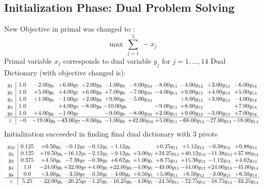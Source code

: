 \documentclass[9pt]{article}
\begin{document}
\subsection{Initialization Phase: Dual Problem Solving}
New Objective in primal was changed to : \[ \max\ \sum_{j=1}^{5}\ - x_j \] 
Primal variable $x_j$ corresponds to dual variable $y_j$ for $j = 1,\ldots,14$
Dual Dictionary (with objective changed is): 
\[\begin{array}{c| c c@{\hskip 2pt} c@{\hskip 2pt} c@{\hskip 2pt} c@{\hskip 2pt} c@{\hskip 2pt} c@{\hskip 2pt} c@{\hskip 2pt} c@{\hskip 2pt} c@{\hskip 2pt} }
 y_{1}   &  1.0 & -2.00 y_{6} & +  6.00 y_{7} & +  2.00 y_{8} & -1.00 y_{9} & -8.00 y_{10} & -8.00 y_{11} & -4.00 y_{12} & +  3.00 y_{13} & -6.00 y_{14}\\
 y_{2}   &  1.0 & +  5.00 y_{6} & +  4.00 y_{7} & +  6.00 y_{8} & +  7.00 y_{9} & -7.00 y_{10} & -4.00 y_{11} & +  9.00 y_{12} & +  4.00 y_{13} & +  5.00 y_{14}\\
 y_{3}   &  1.0 & +  1.00 y_{6} & -1.00 y_{7} & +  2.00 y_{8} & +  9.00 y_{9} & -5.00 y_{10} &   & +  8.00 y_{12} & +  3.00 y_{13} & -4.00 y_{14}\\
 y_{4}   &  1.0  &   & +  4.00 y_{7} & -8.00 y_{8} & -10.00 y_{9} &   & -9.00 y_{11} & +  8.00 y_{12} &   & +  7.00 y_{14}\\
 y_{5}   &  1.0 & +  4.00 y_{6} & -1.00 y_{7} &   & -9.00 y_{9} & -8.00 y_{10} & +  2.00 y_{11} & +  9.00 y_{12} & -3.00 y_{13} & +  7.00 y_{14}\\
\hline
z    &  -0 & -19.00 y_{6} & -43.00 y_{7} & -8.00 y_{8} & -1.00 y_{9} & + 42.00 y_{10} & +  5.00 y_{11} & -68.00 y_{12} & -27.00 y_{13} & -18.00 y_{14}\\
\end{array}\]
Initialization succeeded in finding final dual dictionary with 3 pivots
\[\begin{array}{c| c c@{\hskip 2pt} c@{\hskip 2pt} c@{\hskip 2pt} c@{\hskip 2pt} c@{\hskip 2pt} c@{\hskip 2pt} c@{\hskip 2pt} c@{\hskip 2pt} c@{\hskip 2pt} }
 y_{10}   &  0.125 & +  0.50 y_{6} & -0.12 y_{7} & -0.12 y_{5} & -1.12 y_{9} &   & +  0.25 y_{11} & +  1.12 y_{12} & -0.38 y_{13} & +  0.88 y_{14}\\
 y_{2}   &  0.125 & + 19.50 y_{6} & -16.12 y_{7} & -2.12 y_{5} & -9.12 y_{9} & +  3.00 y_{1} & + 24.25 y_{11} & + 40.12 y_{12} & -11.38 y_{13} & + 37.88 y_{14}\\
 y_{3}   &  0.375 & +  4.50 y_{6} & -7.38 y_{7} & -0.38 y_{5} & +  6.62 y_{9} & +  1.00 y_{1} & +  8.75 y_{11} & + 15.38 y_{12} & -1.12 y_{13} & +  4.62 y_{14}\\
 y_{4}   &  1.0 & -24.00 y_{6} & + 32.00 y_{7} & +  4.00 y_{5} & + 22.00 y_{9} & -4.00 y_{1} & -49.00 y_{11} & -44.00 y_{12} & + 24.00 y_{13} & -45.00 y_{14}\\
 y_{8}   &  0.0 & +  3.00 y_{6} & -3.50 y_{7} & -0.50 y_{5} & -4.00 y_{9} & +  0.50 y_{1} & +  5.00 y_{11} & +  6.50 y_{12} & -3.00 y_{13} & +  6.50 y_{14}\\
\hline
z    &  5.25 & -22.00 y_{6} & -20.25 y_{7} & -1.25 y_{5} & -16.25 y_{9} & -4.00 y_{1} & -24.50 y_{11} & -72.75 y_{12} & -18.75 y_{13} & -33.25 y_{14}\\
\end{array}\]
\end{document}
